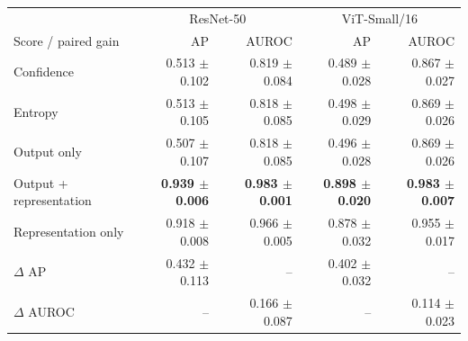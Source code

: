 \begin{tabular}{lrrrr}
\toprule
& \multicolumn{2}{c}{ResNet-50} & \multicolumn{2}{c}{ViT-Small/16} \\
Score / paired gain & AP & AUROC & AP & AUROC \\
\midrule
Confidence & 0.513 $\pm$ 0.102 & 0.819 $\pm$ 0.084 & 0.489 $\pm$ 0.028 & 0.867 $\pm$ 0.027 \\
Entropy & 0.513 $\pm$ 0.105 & 0.818 $\pm$ 0.085 & 0.498 $\pm$ 0.029 & 0.869 $\pm$ 0.026 \\
Output only & 0.507 $\pm$ 0.107 & 0.818 $\pm$ 0.085 & 0.496 $\pm$ 0.028 & 0.869 $\pm$ 0.026 \\
Output + representation & \textbf{0.939 $\pm$ 0.006} & \textbf{0.983 $\pm$ 0.001} & \textbf{0.898 $\pm$ 0.020} & \textbf{0.983 $\pm$ 0.007} \\
Representation only & 0.918 $\pm$ 0.008 & 0.966 $\pm$ 0.005 & 0.878 $\pm$ 0.032 & 0.955 $\pm$ 0.017 \\
$\Delta$ AP & 0.432 $\pm$ 0.113 & -- & 0.402 $\pm$ 0.032 & -- \\
$\Delta$ AUROC & -- & 0.166 $\pm$ 0.087 & -- & 0.114 $\pm$ 0.023 \\
\bottomrule
\end{tabular}
